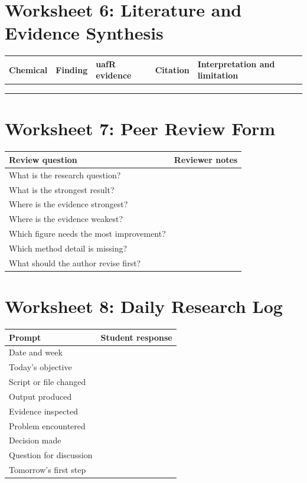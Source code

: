 \section{Worksheet 6: Literature and Evidence Synthesis}
\begin{tabularx}{\textwidth}{p{}p{}p{}p{}Y}
\toprule
\textbf{Chemical} & \textbf{Finding} & \textbf{uafR evidence} & \textbf{Citation} & \textbf{Interpretation and limitation}\\
\midrule
\rule{0pt}{3em} & & & &\\
\rule{0pt}{3em} & & & &\\
\rule{0pt}{3em} & & & &\\
\bottomrule
\end{tabularx}

\section{Worksheet 7: Peer Review Form}
\begin{tabularx}{\textwidth}{p{}Y}
\toprule
\textbf{Review question} & \textbf{Reviewer notes}\\
\midrule
What is the research question? & \rule{0pt}{3em}\\
What is the strongest result? & \rule{0pt}{3em}\\
Where is the evidence strongest? & \rule{0pt}{3em}\\
Where is the evidence weakest? & \rule{0pt}{3em}\\
Which figure needs the most improvement? & \rule{0pt}{3em}\\
Which method detail is missing? & \rule{0pt}{3em}\\
What should the author revise first? & \rule{0pt}{3em}\\
\bottomrule
\end{tabularx}

\section{Worksheet 8: Daily Research Log}
\begin{tabularx}{\textwidth}{p{}Y}
\toprule
\textbf{Prompt} & \textbf{Student response}\\
\midrule
Date and week & \rule{0pt}{2em}\\
Today's objective & \rule{0pt}{2.5em}\\
Script or file changed & \rule{0pt}{2.5em}\\
Output produced & \rule{0pt}{2.5em}\\
Evidence inspected & \rule{0pt}{3em}\\
Problem encountered & \rule{0pt}{3em}\\
Decision made & \rule{0pt}{3em}\\
Question for discussion & \rule{0pt}{3em}\\
Tomorrow's first step & \rule{0pt}{2.5em}\\
\bottomrule
\end{tabularx}

